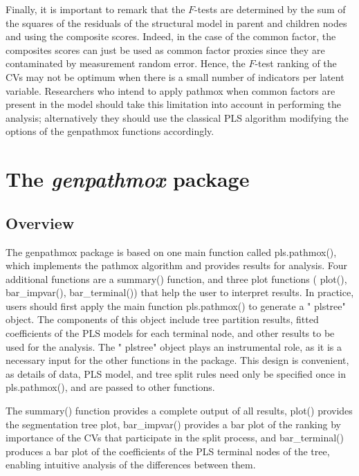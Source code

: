 Finally, it is important to remark that the \(F\)-tests are determined by
the sum of the squares of the residuals of the structural model in
parent and children nodes and using the composite scores. Indeed, in the
case of the common factor, the composites scores can just be used as
common factor proxies since they are contaminated by measurement random
error. Hence, the \(F\)-test ranking of the CVs may not be optimum when
there is a small number of indicators per latent variable. Researchers
who intend to apply pathmox when common factors are present in the model
should take this limitation into account in performing the analysis;
alternatively they should use the classical PLS algorithm modifying the
options of the genpathmox functions accordingly.

\hypertarget{the-genpathmox-package}{%
\section{\texorpdfstring{The \emph{genpathmox} package}{The genpathmox package}}\label{the-genpathmox-package}}

\hypertarget{overview}{%
\subsection{Overview}\label{overview}}

The genpathmox package is based on one main function called
pls.pathmox(), which implements the pathmox algorithm and provides
results for analysis. Four additional functions are a summary()
function, and three plot functions ( plot(), bar\_impvar(),
bar\_terminal()) that help the user to interpret results. In practice,
users should first apply the main function pls.pathmox() to generate a
" plstree" object. The components of this object include tree
partition results, fitted coefficients of the PLS models for each
terminal node, and other results to be used for the analysis. The "
plstree" object plays an instrumental role, as it is a necessary input
for the other functions in the package. This design is convenient, as
details of data, PLS model, and tree split rules need only be specified
once in pls.pathmox(), and are passed to other functions.

The summary() function provides a complete output of all results, plot()
provides the segmentation tree plot, bar\_impvar() provides a bar plot of
the ranking by importance of the CVs that participate in the split
process, and bar\_terminal() produces a bar plot of the coefficients of
the PLS terminal nodes of the tree, enabling intuitive analysis of the
differences between them.

